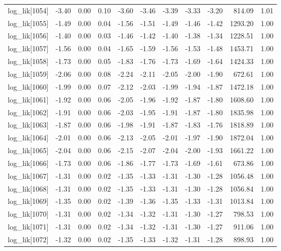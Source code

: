 \begin{table}[ht]
\begin{tabular}{rrrrrrrrrrr}
  log\_lik[1054] & -3.40 & 0.00 & 0.10 & -3.60 & -3.46 & -3.39 & -3.33 & -3.20 & 814.09 & 1.01 \\ 
  log\_lik[1055] & -1.49 & 0.00 & 0.04 & -1.56 & -1.51 & -1.49 & -1.46 & -1.42 & 1293.20 & 1.00 \\ 
  log\_lik[1056] & -1.40 & 0.00 & 0.03 & -1.46 & -1.42 & -1.40 & -1.38 & -1.34 & 1228.51 & 1.00 \\ 
  log\_lik[1057] & -1.56 & 0.00 & 0.04 & -1.65 & -1.59 & -1.56 & -1.53 & -1.48 & 1453.71 & 1.00 \\ 
  log\_lik[1058] & -1.73 & 0.00 & 0.05 & -1.83 & -1.76 & -1.73 & -1.69 & -1.64 & 1424.33 & 1.00 \\ 
  log\_lik[1059] & -2.06 & 0.00 & 0.08 & -2.24 & -2.11 & -2.05 & -2.00 & -1.90 & 672.61 & 1.00 \\ 
  log\_lik[1060] & -1.99 & 0.00 & 0.07 & -2.12 & -2.03 & -1.99 & -1.94 & -1.87 & 1472.18 & 1.00 \\ 
  log\_lik[1061] & -1.92 & 0.00 & 0.06 & -2.05 & -1.96 & -1.92 & -1.87 & -1.80 & 1608.60 & 1.00 \\ 
  log\_lik[1062] & -1.91 & 0.00 & 0.06 & -2.03 & -1.95 & -1.91 & -1.87 & -1.80 & 1835.98 & 1.00 \\ 
  log\_lik[1063] & -1.87 & 0.00 & 0.06 & -1.98 & -1.91 & -1.87 & -1.83 & -1.76 & 1818.89 & 1.00 \\ 
  log\_lik[1064] & -2.01 & 0.00 & 0.06 & -2.13 & -2.05 & -2.01 & -1.97 & -1.90 & 1872.04 & 1.00 \\ 
  log\_lik[1065] & -2.04 & 0.00 & 0.06 & -2.15 & -2.07 & -2.04 & -2.00 & -1.93 & 1661.22 & 1.00 \\ 
  log\_lik[1066] & -1.73 & 0.00 & 0.06 & -1.86 & -1.77 & -1.73 & -1.69 & -1.61 & 673.86 & 1.00 \\ 
  log\_lik[1067] & -1.31 & 0.00 & 0.02 & -1.35 & -1.33 & -1.31 & -1.30 & -1.28 & 1056.48 & 1.00 \\ 
  log\_lik[1068] & -1.31 & 0.00 & 0.02 & -1.35 & -1.33 & -1.31 & -1.30 & -1.28 & 1056.84 & 1.00 \\ 
  log\_lik[1069] & -1.35 & 0.00 & 0.02 & -1.39 & -1.36 & -1.35 & -1.33 & -1.31 & 1013.84 & 1.00 \\ 
  log\_lik[1070] & -1.31 & 0.00 & 0.02 & -1.34 & -1.32 & -1.31 & -1.30 & -1.27 & 798.53 & 1.00 \\ 
  log\_lik[1071] & -1.31 & 0.00 & 0.02 & -1.34 & -1.32 & -1.31 & -1.30 & -1.27 & 911.06 & 1.00 \\ 
  log\_lik[1072] & -1.32 & 0.00 & 0.02 & -1.35 & -1.33 & -1.32 & -1.31 & -1.28 & 898.93 & 1.00 \\ 

\end{tabular}
\end{table}
